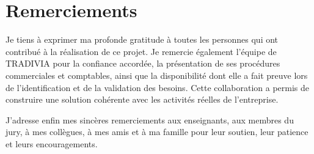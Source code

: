 \documentclass[12pt,a4paper,oneside]{report}
\begin{document}
\newpage
\thispagestyle{empty}
\null
\newpage

\setcounter{page}{2}

\chapter*{Remerciements}
Je tiens à exprimer ma profonde gratitude à toutes les personnes qui ont contribué à la réalisation de ce projet. Je remercie également l'équipe de TRADIVIA pour la confiance accordée, la présentation de ses procédures commerciales et comptables, ainsi que la disponibilité dont elle a fait preuve lors de l'identification et de la validation des besoins. Cette collaboration a permis de construire une solution cohérente avec les activités réelles de l'entreprise.

J'adresse enfin mes sincères remerciements aux enseignants, aux membres du jury, à mes collègues, à mes amis et à ma famille pour leur soutien, leur patience et leurs encouragements.




\tableofcontents
\listoffigures
\listoftables
\end{document}

